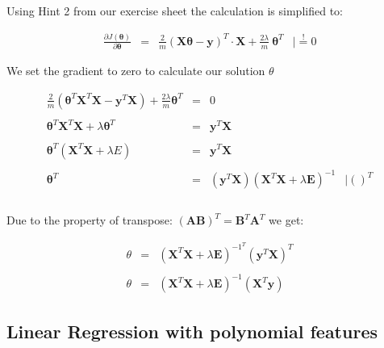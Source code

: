 \documentclass{article}
\begin{document}
\begin{itemize}
    Using Hint 2 from our exercise sheet the calculation is simplified to:
    
    $$\begin{array}{rclr}
        \frac{\partial J(\boldsymbol{\theta})}{\partial \boldsymbol{\theta}} & = & \frac{2}{m}(\boldsymbol{X\theta - y})^T \cdot \boldsymbol{X} + \frac{2\lambda}{m}\ \boldsymbol{\theta}^T & \mid \overset{!}{=} 0
    \end{array}$$

    We set the gradient to zero to calculate our solution $\theta$
    
    $$\begin{array}{rclr}    
    \frac{2}{m}(\boldsymbol{\theta}^T \boldsymbol{X}^T \boldsymbol{X} - \boldsymbol{y}^T \boldsymbol{X}) + \frac{2\lambda}{m}\boldsymbol{\theta}^T & = & 0 \\\\
    \boldsymbol{\theta}^T \boldsymbol{X}^T \boldsymbol{X} + \lambda \boldsymbol{\theta}^T & = & \boldsymbol{y}^T \boldsymbol{X} & \\\\
    \boldsymbol{\theta}^T (\boldsymbol{X}^T \boldsymbol{X} + \lambda E) & = & \boldsymbol{y}^T\boldsymbol{X} & \\\\
    \boldsymbol{\theta}^T & = & (\boldsymbol{y}^T \boldsymbol{X})(\boldsymbol{X}^T \boldsymbol{X} + \lambda \boldsymbol{E})^{-1} & \mid ()^T \\\\
    \end{array}$$
	
	Due to the property of transpose: $ (\boldsymbol{A}\boldsymbol{B})^T = \boldsymbol{B}^T\boldsymbol{A}^T $ we get:
	
	$$\begin{array}{rcl}
	
    \theta & = & (\boldsymbol{X}^T\boldsymbol{X} + \lambda\boldsymbol{E})^{-1^T} (\boldsymbol{y}^T\boldsymbol{X})^T \\\\
    \theta & = & (\boldsymbol{X}^T\boldsymbol{X} + \lambda\boldsymbol{E})^{-1} (\boldsymbol{X}^T\boldsymbol{y})
	\end{array}$$
    
\end{itemize}

\newpage

\subsection{Linear Regression with polynomial features}
\end{document}
